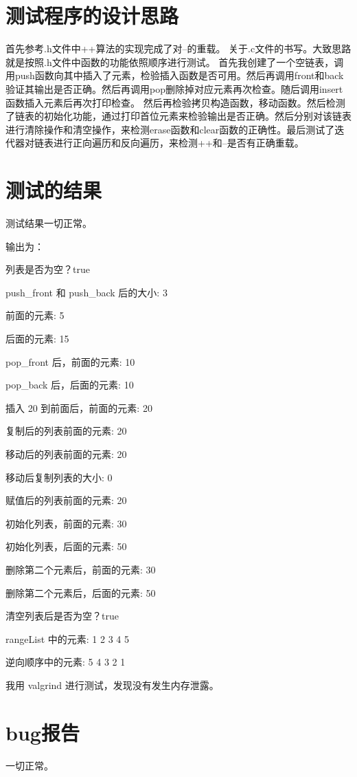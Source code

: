 \documentclass[UTF8]{ctexart}
\begin{document}
\pagestyle{fancy}
\fancyhead{}

\section{测试程序的设计思路}

首先参考.h文件中++算法的实现完成了对--的重载。
关于.c文件的书写。大致思路就是按照.h文件中函数的功能依照顺序进行测试。
首先我创建了一个空链表，调用push函数向其中插入了元素，检验插入函数是否可用。然后再调用front和back验证其输出是否正确。然后再调用pop删除掉对应元素再次检查。随后调用insert函数插入元素后再次打印检查。
然后再检验拷贝构造函数，移动函数。然后检测了链表的初始化功能，通过打印首位元素来检验输出是否正确。然后分别对该链表进行清除操作和清空操作，来检测erase函数和clear函数的正确性。最后测试了迭代器对链表进行正向遍历和反向遍历，来检测++和--是否有正确重载。
\section{测试的结果}

测试结果一切正常。

输出为： 

列表是否为空？true \par
push\_front 和 push\_back 后的大小: 3 \par
前面的元素: 5 \par
后面的元素: 15 \par
pop\_front 后，前面的元素: 10 \par
pop\_back 后，后面的元素: 10 \par
插入 20 到前面后，前面的元素: 20 \par
复制后的列表前面的元素: 20 \par
移动后的列表前面的元素: 20 \par
移动后复制列表的大小: 0 \par
赋值后的列表前面的元素: 20 \par
初始化列表，前面的元素: 30 \par
初始化列表，后面的元素: 50 \par
删除第二个元素后，前面的元素: 30 \par
删除第二个元素后，后面的元素: 50 \par
清空列表后是否为空？true \par
rangeList 中的元素: 1 2 3 4 5  \par
逆向顺序中的元素: 5 4 3 2 1  \par
我用 valgrind 进行测试，发现没有发生内存泄露。

\section{bug报告}

一切正常。

\end{document}
